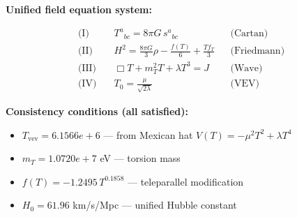 
\textbf{Unified field equation system:}

\begin{align}
  \text{(I)} \quad & T^a{}_{bc} = 8\pi G \, s^a{}_{bc} && \text{(Cartan)} \\
  \text{(II)} \quad & H^2 = \frac{8\pi G}{3}\rho - \frac{f(T)}{6} + \frac{Tf_T}{3} && \text{(Friedmann)} \\
  \text{(III)} \quad & \Box T + m_T^2 T + \lambda T^3 = J && \text{(Wave)} \\
  \text{(IV)} \quad & T_0 = \frac{\mu}{\sqrt{2\lambda}} && \text{(VEV)}
\end{align}

\textbf{Consistency conditions (all satisfied):}
\begin{itemize}
  \item $T_{\text{vev}} = 6.1566e+6$ — from Mexican hat $V(T) = -\mu^2 T^2 + \lambda T^4$
  \item $m_T = 1.0720e+7$ eV — torsion mass
  \item $f(T) = -1.2495 \, T^{0.1858}$ — teleparallel modification
  \item $H_0 = 61.96$ km/s/Mpc — unified Hubble constant
\end{itemize}